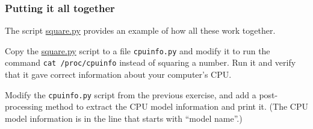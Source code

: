 \documentclass[english,serif,mathserif,xcolor=pdftex,dvipsnames,table]{beamer}
\begin{document}
\begin{frame}[fragile]
  \frametitle{Putting it all together}

  The script
  \href{https://github.com/uzh/gc3pie/blob/master/docs/programmers/tutorials/bottom-up/square.py}{square.py}
  provides an example of how all these work together.
\end{frame}


\begin{frame}
  \begin{exercise}
    Copy the
    \href{https://github.com/uzh/gc3pie/blob/master/docs/programmers/tutorials/bottom-up/square.py}{square.py}
    script to a file \texttt{cpuinfo.py} and modify it to run the
    command \texttt{cat /proc/cpuinfo} instead of squaring a number.
    Run it and verify that it gave correct information about your computer's CPU.
  \end{exercise}

  \+
  \begin{exercise}
    Modify the \texttt{cpuinfo.py} script from the previous exercise,
    and add a post-processing method to extract the CPU model
    information and print it.  (The CPU model information is in the
    line that starts with ``model name''.)
  \end{exercise}
\end{frame}
\end{document}
